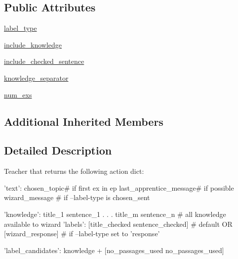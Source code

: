 \subsection*{Public Attributes}
\begin{DoxyCompactItemize}
\item 
\hyperlink{classparlai_1_1tasks_1_1wizard__of__wikipedia_1_1agents_1_1WizardDialogKnowledgeTeacher_a90ee3b140e3c996f086dfd673bbc57b3}{label\+\_\+type}
\item 
\hyperlink{classparlai_1_1tasks_1_1wizard__of__wikipedia_1_1agents_1_1WizardDialogKnowledgeTeacher_a2b468dc6d3e2072ba8a8b8fae0819e34}{include\+\_\+knowledge}
\item 
\hyperlink{classparlai_1_1tasks_1_1wizard__of__wikipedia_1_1agents_1_1WizardDialogKnowledgeTeacher_ac8ea6c9184d7ca02160700ed481f480c}{include\+\_\+checked\+\_\+sentence}
\item 
\hyperlink{classparlai_1_1tasks_1_1wizard__of__wikipedia_1_1agents_1_1WizardDialogKnowledgeTeacher_a6b730a4589d91298fd7b54aa0c355046}{knowledge\+\_\+separator}
\item 
\hyperlink{classparlai_1_1tasks_1_1wizard__of__wikipedia_1_1agents_1_1WizardDialogKnowledgeTeacher_a263ebbfdc445fd19bc664ebf2e72ab30}{num\+\_\+exs}
\end{DoxyCompactItemize}
\subsection*{Additional Inherited Members}


\subsection{Detailed Description}
\begin{DoxyVerb}    Teacher that returns the following action dict:
    {
        'text': chosen_topic\n # if first ex in ep
                last_apprentice_message\n # if possible
                wizard_message # if --label-type is chosen_sent

        'knowledge': title_1 sentence_1\n
                            .
                            .
                            .
                     title_m sentence_n # all knowledge available to wizard
        'labels': [title_checked sentence_checked] # default
                                    OR
                  [wizard_response] # if --label-type set to 'response'

        'label_candidates': knowledge + [no_passages_used no_passages_used]
    }
\end{DoxyVerb}
 

